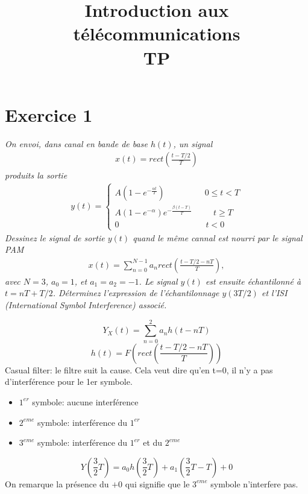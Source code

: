 \documentclass[a4paper, 11pt, onecolumn]{article}
\title{Introduction aux télécommunications\\TP}
\begin{document}
\maketitle
\section{Exercice 1}
	\textit{On envoi, dans canal en bande de base $h(t)$, un signal
	\begin{eqnarray}x(t)=rect\left(\frac{t-T/2}{T}\right)\end{eqnarray}
	produits la sortie
	\begin{eqnarray}
	y(t)=
	\left\lbrace 
	\begin{array}{lll}
		A(1-e^{-\frac{\alpha t}{T}})\;\;\;\;\;\;\;\;\;\;\;\;\;\;\;\;\;0\leq t < T\\
		A(1-e^{-\alpha})e^{-\frac{\beta(t-T)}{T}}\;\;\;\;\;\;\;\;\;t \geq T\\
		0\;\;\;\;\;\;\;\;\;\;\;\;\;\;\;\;\;\;\;\;\;\;\;\;\;\;\;\;\;\;\;\;\;\;\;\;\;t < 0
	\end{array}
	\right.
	\end{eqnarray}
	Dessinez le signal de sortie $y(t)$ quand le même cannal est nourri par le signal PAM
	\begin{eqnarray}
	x(t)=\sum_{n=0}^{N-1}a_nrect\left(\frac{t-T/2-nT}{T}\right),
	\end{eqnarray}
	avec $N=3$, $a_0=1$, et $a_1=a_2=-1$. Le signal $y(t)$ est ensuite échantilonné à $t=nT+T/2$. Déterminez l'expression de l'échantilonnage $y(3T/2)$ et l'ISI (International Symbol Interference) associé.}
	\begin{framed}
	$$Y_X(t)=\sum_{n=0}^2a_nh(t-nT)$$
	$$h(t) = F\left(rect\left(\frac{t-T/2-nT}{T}\right)\right)$$
	Casual filter: le filtre suit la cause. Cela veut dire qu'en t=0, il n'y a pas d'interférence pour le 1er symbole.
	\begin{itemize}
		\item $1^{er}$ symbole: aucune interférence
		\item $2^{eme}$ symbole: interférence du $1^{er}$
		\item $3^{eme}$ symbole: interférence du $1^{er}$ et du $2^{eme}$
	\end{itemize}
	$$Y\left(\frac{3}{2}T\right) = a_0h\left(\frac{3}{2}T\right) +  a_1\left(\frac{3}{2}T-T\right)+0$$
	On remarque la présence du $+ 0$ qui signifie que le $3^{eme}$ symbole n'interfere pas.
	\end{framed}
\end{document}
